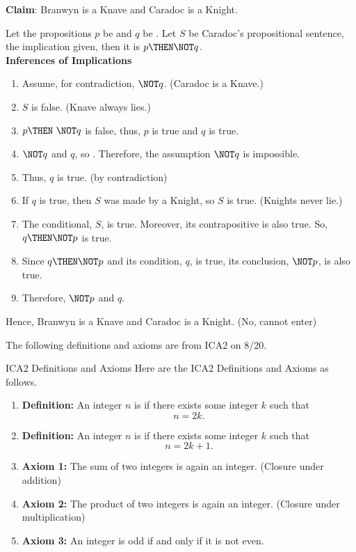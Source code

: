 \begin{enumerate}
\begin{enumerate}
  {\color{redcolor}\textbf{Claim}: Branwyn is a Knave and Caradoc is a Knight.}
  \begin{subprove}
    Let the propositions \(p\) be  and 
    \(q\) be . Let \(S\) be Caradoc's propositional
    sentence, the implication given, then it is \(p \THEN \NOT q\).\\
    \textbf{Inferences of Implications}
    \begin{enumerate}
      \item Assume, for contradiction, \(\NOT q\). (Caradoc is a Knave.)
      \item \(S\) is false. (Knave always lies.)
      \item \(p \THEN ~\NOT q\) is false, thus, \(p\) is true and \(q\) is true.
      \item \(\NOT q\) and \(q\), so \FALSE. Therefore, the assumption \(\NOT q\) is impossible.
      \item Thus, \(q\) is true. (by contradiction)
      \item If \(q\) is true, then \(S\) was made by a Knight, so \(S\) is true. (Knights never lie.)
      \item The conditional, \(S\), is true. Moreover, its contrapositive is also true. So, \(q \THEN \NOT p\) is true.
      \item Since \(q \THEN \NOT p\) and its condition, $q$, is true, its conclusion, \(\NOT p\), is also true.
      \item Therefore, \(\NOT p\) and \(q\).
    \end{enumerate}
    Hence, Branwyn is a Knave and Caradoc is a Knight. (No, cannot enter)
  \end{subprove}
  \end{enumerate}




  \newpage

  The following definitions and axioms are from ICA2 on 8/20.

  \begin{define}{ICA2 Definitions and Axioms}
    Here are the ICA2 Definitions and Axioms as follows.
    \begin{enumerate}
      \item \textbf{Definition:} An integer $n$ is  if 
      there exists some integer $k$ such that
      \[
      n = 2k.
      \]
      \item \textbf{Definition:} An integer $n$ is  if 
      there exists some integer $k$ such that
      \[
      n = 2k + 1.
      \]
      \item \textbf{Axiom 1:} The sum of two integers is again an 
      integer. (Closure under addition)
      \item \textbf{Axiom 2:} The product of two integers is again 
      an integer. (Closure under multiplication)
      \item \textbf{Axiom 3:} An integer is odd if and only if it 
      is not even.
    \end{enumerate}
  \end{define}


\end{enumerate}
